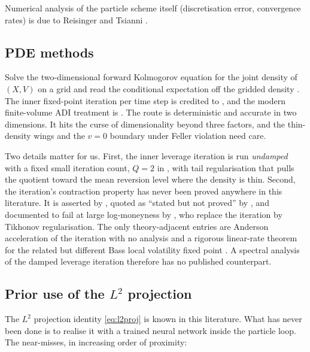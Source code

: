 \documentclass[11pt,a4paper]{article}
\theoremstyle{plain}
\theoremstyle{definition}
\theoremstyle{definition}
\begin{document}
Numerical analysis of the particle scheme itself (discretisation error, convergence rates) is due to Reisinger and Tsianni \citep{reisinger2023,reisinger2025}.

\subsection{PDE methods}

Solve the two-dimensional forward Kolmogorov equation for the joint density of $(X, V)$ on a grid and read the conditional expectation off the gridded density \citep{ren2007}. The inner fixed-point iteration per time step is credited to \citet{tataru2010}, and the modern finite-volume ADI treatment is \citep{wyns2017adjoint,wyns2017fv}. The route is deterministic and accurate in two dimensions. It hits the curse of dimensionality beyond three factors, and the thin-density wings and the $v = 0$ boundary under Feller violation need care.

Two details matter for us. First, the inner leverage iteration is run \emph{undamped} with a fixed small iteration count, $Q = 2$ in \citet[Sec.~7]{wyns2017adjoint}, with tail regularisation that pulls the quotient toward the mean reversion level where the density is thin. Second, the iteration's contraction property has never been proved anywhere in this literature. It is asserted by \citet{reghai2006}, quoted as ``stated but not proved'' by \citet[App.~E.3]{cozma2019}, and documented to fail at large log-moneyness by \citet{saporito2019}, who replace the iteration by Tikhonov regularisation. The only theory-adjacent entries are Anderson acceleration of the iteration with no analysis \citep{nastasi2020} and a rigorous linear-rate theorem for the related but different Bass local volatility fixed point \citep{acciaio2024bass}. A spectral analysis of the damped leverage iteration therefore has no published counterpart.

\subsection{Prior use of the $L^2$ projection}\label{subsec:closest}

The $L^2$ projection identity \cref{eq:l2proj} is known in this literature. What has never been done is to realise it with a trained neural network inside the particle loop. The near-misses, in increasing order of proximity:
\end{document}
